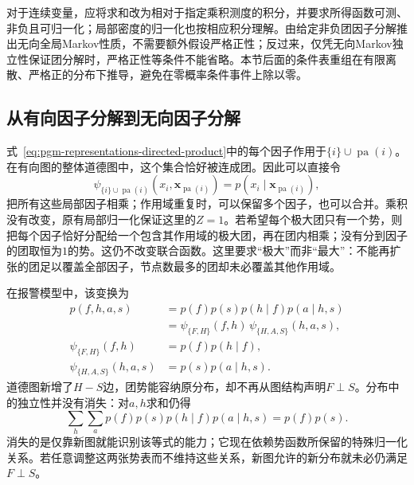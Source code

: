 对于连续变量，应将求和改为相对于指定乘积测度的积分，并要求所得函数可测、非负且可归一化；局部密度的归一化也按相应积分理解。由给定非负团因子分解推出无向全局Markov性质，不需要额外假设严格正性；反过来，仅凭无向Markov独立性保证团分解时，严格正性等条件不能省略。本节后面的条件表重组在有限离散、严格正的分布下推导，避免在零概率条件事件上除以零。

\subsection{从有向因子分解到无向因子分解}
\label{sec:pgm-representations-directed-to-undirected}

式~\eqref{eq:pgm-representations-directed-product}中的每个因子作用于$\{i\}\cup\operatorname{pa}(i)$。在有向图的整体道德图中，这个集合恰好被连成团。因此可以直接令
\[
  \psi_{\{i\}\cup\operatorname{pa}(i)}
  (x_i,\bm{x}_{\operatorname{pa}(i)})
  =
  p(x_i\mid\bm{x}_{\operatorname{pa}(i)}),
\]
把所有这些局部因子相乘；作用域重复时，可以保留多个因子，也可以合并。乘积没有改变，原有局部归一化保证这里的$Z=1$。若希望每个极大团只有一个势，则把每个因子恰好分配给一个包含其作用域的极大团，再在团内相乘；没有分到因子的团取恒为$1$的势。这仍不改变联合函数。这里要求“极大”而非“最大”：不能再扩张的团足以覆盖全部因子，节点数最多的团却未必覆盖其他作用域。

在报警模型中，该变换为
\begin{equation}
  \begin{aligned}
    p(f,h,a,s)&=p(f)p(s)p(h\mid f)p(a\mid h,s)\\
    &=\psi_{\{F,H\}}(f,h)\,
      \psi_{\{H,A,S\}}(h,a,s),\\
    \psi_{\{F,H\}}(f,h)&=p(f)p(h\mid f),\\
    \psi_{\{H,A,S\}}(h,a,s)&=p(s)p(a\mid h,s).
  \end{aligned}
  \label{eq:pgm-representations-alarm-potentials}
\end{equation}
道德图新增了$H-S$边，团势能容纳原分布，却不再从图结构声明$F\perp S$。分布中的独立性并没有消失：对$a,h$求和仍得
\[
  \sum_h\sum_a p(f)p(s)p(h\mid f)p(a\mid h,s)
  =p(f)p(s).
\]
消失的是仅靠新图就能识别该等式的能力；它现在依赖势函数所保留的特殊归一化关系。若任意调整这两张势表而不维持这些关系，新图允许的新分布就未必仍满足$F\perp S$。

